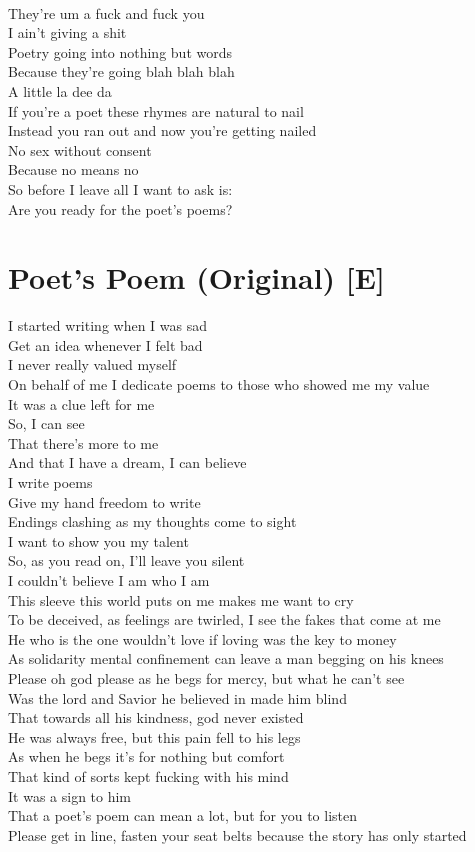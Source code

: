 \documentclass[12pt, b5paper, oneside]{book}
\begin{document}
\\They're um a fuck and fuck you
\\I ain't giving a shit
\\Poetry going into nothing but words
\\Because they're going blah blah blah
\\A little la dee da
\\If you're a poet these rhymes are natural to nail
\\Instead you ran out and now you're getting nailed
\\No sex without consent
\\Because no means no
\\So before I leave all I want to ask is: 
\\Are you ready for the poet's poems? 
\newpage
\section{Poet's Poem (Original) [E]}
I started writing when I was sad\\
Get an idea whenever I felt bad\\
I never really valued myself\\ 
On behalf of me I dedicate poems to those who showed me my value\\ 
It was a clue left for me\\ 
So, I can see\\
That there’s more to me\\ 
And that I have a dream, I can believe\\ 
I write poems\\ 
Give my hand freedom to write\\ 
Endings clashing as my thoughts come to sight\\ 
I want to show you my talent\\ 
So, as you read on, I’ll leave you silent\\ 
I couldn’t believe I am who I am\\ 
This sleeve this world puts on me makes me want to cry\\
To be deceived, as feelings are twirled, I see the fakes that come at me\\ 
He who is the one wouldn’t love if loving was the key to money\\
As solidarity mental confinement can leave a man begging on his knees\\ 
Please oh god please as he begs for mercy, but what he can’t see\\ 
Was the lord and Savior he believed in made him blind\\ 
That towards all his kindness, god never existed\\ 
He was always free, but this pain fell to his legs\\ 
As when he begs it’s for nothing but comfort\\
That kind of sorts kept fucking with his mind\\ 
It was a sign to him\\
That a poet’s poem can mean a lot, but for you to listen\\
Please get in line, fasten your seat belts because the story has only started
\newpage
\end{document}
